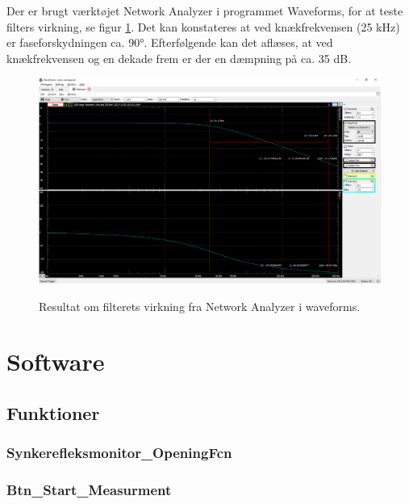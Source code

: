 Der er brugt værktøjet Network Analyzer i programmet Waveforms, for at teste filters virkning, se figur \ref{fig:aafiltermodultest}. Det kan konstateres at ved knækfrekvensen (25 kHz) er faseforskydningen ca. \ang{90}. Efterfølgende kan det aflæses, at ved knækfrekvensen og en dekade frem er der en dæmpning på ca. 35 dB.



\begin{figure}[H] 
\centering
{\includegraphics[width=\linewidth]
{Figure/aafiltermodultest}}
\caption{Resultat om filterets virkning fra Network Analyzer i waveforms.}
\label{fig:aafiltermodultest}
\end{figure}





\section{Software}

\subsection{Funktioner}
\subsubsection{Synkerefleksmonitor\_OpeningFcn}








\subsubsection{Btn\_Start\_Measurment}

